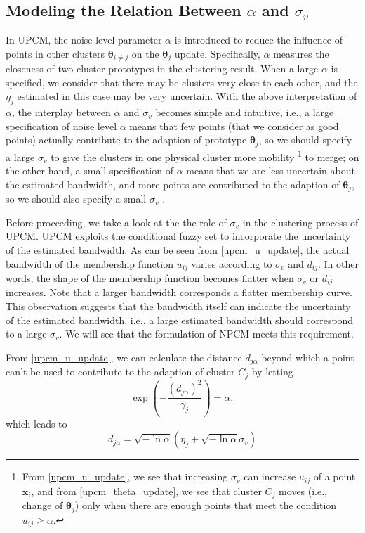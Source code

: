 \documentclass[conference]{IEEEtran}
\theoremstyle{definition}
\begin{document}
\subsection{Modeling the Relation Between $\alpha$ and $\sigma_v$}
\label{sec-3-3}
In UPCM, the noise level parameter $\alpha$ is introduced to reduce the influence of points in other clusters $\boldsymbol{\theta}_{i\neq j}$ on the $\boldsymbol{\theta}_j$ update. Specifically, $\alpha$ measures the closeness of two cluster prototypes in the clustering result. When a large $\alpha$ is specified, we consider that there may be clusters very close to each other, and the $\eta_j$ estimated in this case may be very uncertain. With the above interpretation of $\alpha$, the interplay between $\alpha$ and $\sigma_v$ becomes simple and intuitive, i.e., a large specification of noise level $\alpha$ means that few points (that we consider as good points) actually contribute to the adaption of prototype $\boldsymbol{\theta}_j$, so we should specify a large $\sigma_v$ to give the clusters in one physical cluster more mobility
\footnote{From \eqref{upcm_u_update}, we see that increasing $\sigma_v$ can increase $u_{ij}$ of a point $\mathbf{x}_i$, and from \eqref{upcm_theta_update}, we see that cluster $C_j$ moves (i.e., change of $\boldsymbol{\theta}_j$) only when there are enough points that meet the condition $u_{ij}\geq \alpha$.}
to merge; on the other hand, a small specification of $\alpha$ means that we are less uncertain about the estimated bandwidth, and more points are contributed to the adaption of $\boldsymbol{\theta}_j$, so we should also specify a small $\sigma_v$ \cite{hou_pcm_2016}. 

Before proceeding, we take a look at the the role of $\sigma_v$ in the clustering process of UPCM. UPCM exploits the conditional fuzzy set to incorporate the uncertainty of the estimated bandwidth. As can be seen from \eqref{upcm_u_update}, the actual bandwidth of the membership function $u_{ij}$ varies according to $\sigma_v$ and $d_{ij}$. In other words, the shape of the membership function becomes flatter when $\sigma_v$ or $d_{ij}$ increases. Note that a larger bandwidth corresponds a flatter membership curve. This observation suggests that the bandwidth itself can indicate the uncertainty of the estimated bandwidth, i.e., a large estimated bandwidth should correspond to a large $\sigma_v$. We will see that the formulation of NPCM meets this requirement.

From \eqref{upcm_u_update}, we can calculate the distance $d_{j\alpha}$ beyond which a point can't be used to contribute to the adaption of cluster $C_j$ by letting
\begin{equation}
\exp\left(-\frac{(d_{j\alpha})^2}{\gamma_j}\right)=\alpha,
\end{equation}
which leads to
\begin{equation}
\label{npcm_d_alpha}
d_{j\alpha}=\sqrt{-\ln\alpha}\left(\eta_j+\sqrt{-\ln\alpha}\sigma_v\right)
\end{equation}
\end{document}
